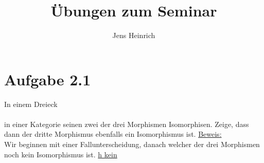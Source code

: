 \documentclass{article}
\title{\"Ubungen zum Seminar \boldfont{Kategorientheorie} }
\author{Jens Heinrich}
\begin{document}
 

\section*{Aufgabe 2.1}
	In einem Dreieck 
	\\
	
	\\
	in einer Kategorie seinen zwei der drei Morphismen Isomorphisen.
	Zeige, dass dann der dritte Morphismus ebenfalls ein Isomorphismus ist.
	\underline{Beweis:} \\
		Wir beginnen mit einer Fallunterscheidung, danach welcher der drei Morphismen noch kein Isomorphismus ist.
		\underline{h kein \Iso}		
\end{document}
